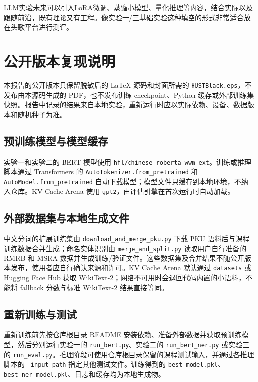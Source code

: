 \documentclass[12pt,a4paper,UTF8]{ctexart}
\newcommand{\xiaosi}{\fontsize{12pt}{18pt}\selectfont}
\newenvironment{reportbody}{\songti\xiaosi\onehalfspacing\sloppy}{}
\begin{document}
\begin{reportbody}
LLM实验未来可以引入LoRA微调、蒸馏小模型、量化推理等内容，结合实际以及跟随前沿，既有理论又有工程。像实验一/三基础实验这种填空的形式非常适合放在头歌平台进行测评。

\section*{公开版本复现说明}
{}
本报告的公开版本只保留脱敏后的 LaTeX 源码和封面所需的 \texttt{HUSTBlack.eps}，不发布由本源码生成的 PDF，也不发布训练 checkpoint、Python 缓存或外部训练集快照。报告中记录的结果来自本地实验，重新运行时应以实际依赖、设备、数据版本和随机种子为准。

\subsection*{预训练模型与模型缓存}
实验一和实验二的 BERT 模型使用 \texttt{hfl/chinese-roberta-wwm-ext}。训练或推理脚本通过 Transformers 的 \texttt{AutoTokenizer.from\_pretrained} 和 \texttt{AutoModel.from\_pretrained} 自动下载模型；模型文件只缓存到本地环境，不纳入仓库。KV Cache Arena 使用 \texttt{gpt2}，由评估引擎在首次运行时自动加载。

\subsection*{外部数据集与本地生成文件}
中文分词的扩展训练集由 \texttt{download\_and\_merge\_pku.py} 下载 PKU 语料后与课程训练数据合并生成；命名实体识别由 \texttt{merge\_and\_split.py} 读取用户自行准备的 RMRB 和 MSRA 数据并生成训练/验证文件。这些数据集及合并结果不随公开版本发布，使用者应自行确认来源和许可。KV Cache Arena 默认通过 \texttt{datasets} 或 Hugging Face Hub 获取 WikiText-2；网络不可用时会退回代码内置的小语料，不能将 fallback 分数与标准 WikiText-2 结果直接等同。

\subsection*{重新训练与测试}
重新训练前先按仓库根目录 README 安装依赖、准备外部数据并获取预训练模型，然后分别运行实验一的 \texttt{run\_bert.py}、实验二的 \texttt{run\_bert\_ner.py} 或实验三的 \texttt{run\_eval.py}。推理阶段可使用仓库根目录保留的课程测试输入，并通过各推理脚本的 \texttt{--input\_path} 指定其他测试文件。训练得到的 \texttt{best\_model.pkl}、\texttt{best\_ner\_model.pkl}、日志和缓存均为本地生成物。
\clearpage

\end{reportbody}
\end{document}
